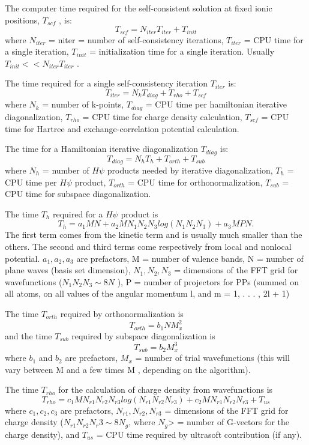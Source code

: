 \documentclass[12pt,a4paper]{article}
\begin{document}
The computer time required for the self-consistent solution at fixed ionic
positions, $T_{scf}$ , is:
$$T_{scf} = N_{iter} T_{iter} + T_{init}$$
where $N_{iter}$ = niter = number of self-consistency iterations, 
$T_{iter}$ = CPU
time for a single iteration, $T_{init}$ = initialization time for a single
iteration. Usually $T_{init} << N_{iter} T_{iter}$ .
    
The time required for a single self-consistency iteration $T_{iter}$ is:
$$T_{iter} = N_k T_{diag} +T_{rho} + T_{scf}$$
where $N_k$ = number of k-points, $T_{diag}$ = CPU time per 
hamiltonian iterative diagonalization, $T_{rho}$ = CPU time for charge density 
calculation, $T_{scf}$ = CPU time for Hartree and exchange-correlation potential
calculation.
    
The time for a Hamiltonian iterative diagonalization $T_{diag}$ is:
$$T_{diag} = N_h T_h + T_{orth} + T_{sub}$$
where $N_h$ = number of $H\psi$ products needed by iterative diagonalization,
$T_h$ = CPU time per $H\psi$ product, $T_{orth}$ = CPU time for 
orthonormalization, $T_{sub}$ = CPU time for subspace diagonalization.
    
The time $T_h$ required for a $H\psi$ product is
$$T_h = a_1 M N + a_2 M N_1 N_2 N_3 log(N_1 N_2 N_3 ) + a_3 M P N. $$
The first term comes from the kinetic term and is usually much smaller
than the others. The second and third terms come respectively from local
and nonlocal potential. $a_1, a_2, a_3$ are prefactors, M = number of valence
bands, N = number of plane waves (basis set dimension), $N_1, N_2, N_3$ =
dimensions of the FFT grid for wavefunctions ($N_1 N_2 N_3 \sim 8N$ ), 
P = number of projectors for PPs (summed on all atoms, on all values of the
angular momentum l, and m = 1, . . . , 2l + 1)
    
The time $T_{orth}$ required by orthonormalization is
$$T_{orth} = b_1 N M_x^2$$ 
and the time $T_{sub}$ required by subspace diagonalization is
$$T_{sub} = b_2 M_x^3$$
where $b_1$ and $b_2$ are prefactors, $M_x$ = number of trial wavefunctions 
(this will vary between M and a few times M , depending on the algorithm).
    
The time $T_{rho}$ for the calculation of charge density from wavefunctions is
$$T_{rho} = c_1 M N_{r1} N_{r2}N_{r3} log(N_{r1} N_{r2} N_{r3}) + 
            c_2 M N_{r1} N_{r2} N_{r3} + T_{us}$$
where $c_1, c_2, c_3$ are prefactors, $N_{r1}, N_{r2}, N_{r3}$ =
dimensions of the FFT grid for charge density ($N_{r1} N_{r2} N_r3 \sim 8N_g$,
where $N_g$> = number of G-vectors for the charge density), and 
$T_{us}$ = CPU time required by ultrasoft contribution (if any).
 
\end{document}
